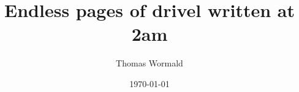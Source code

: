 \documentclass[authoryearcitations]{UoYCSproject}
\title{Endless pages of drivel written at 2am}
\author{Thomas Wormald}
\date{\today}
\begin{document}
\maketitle

\label{sec:start}












\appendix


\end{document}
